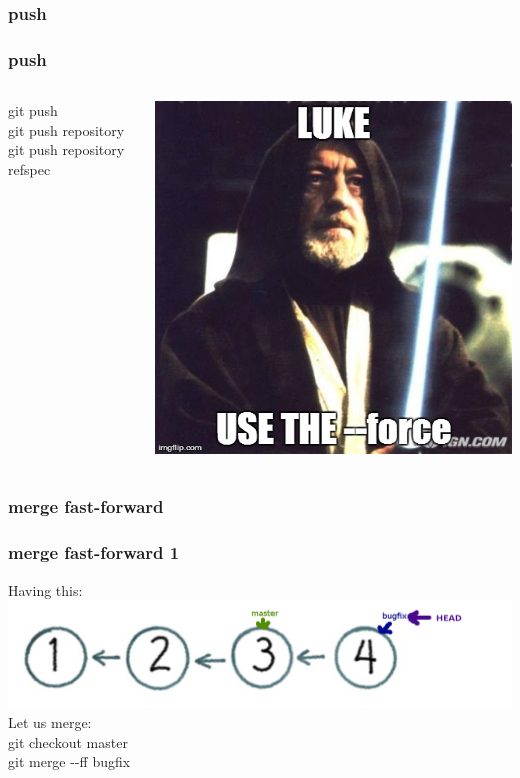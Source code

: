 \documentclass{beamer}
\begin{document}
		\subsubsection{push}
		\begin{frame}
			\frametitle{push}
			\begin{columns}
				git push\\
				git push repository\\
				git push repository refspec\\
				\begin{center}
					\includegraphics[scale=.2]{images/git_starwars}
				\end{center}

			\end{columns}
		\end{frame}


		\subsubsection{merge fast-forward}
		\begin{frame}
			\frametitle{merge fast-forward 1}
        Having this: \\
				\includegraphics[scale=0.3]{images/merge_ff1}\\
        Let us merge: \\
        git checkout master \\
        git merge -{}-ff bugfix \\
		\end{frame}
\end{document}
